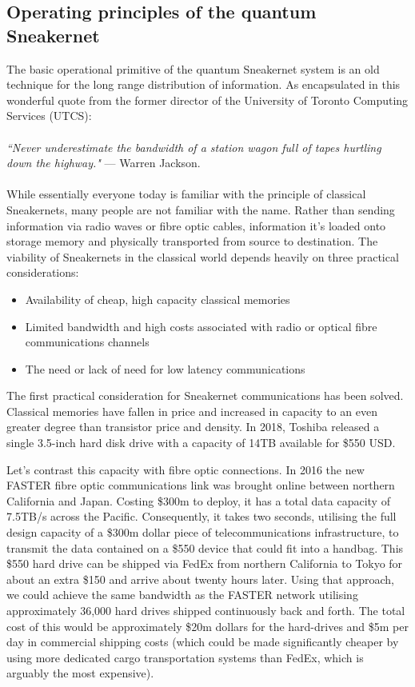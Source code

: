 \documentclass[twocolumn, aps, rmp, amsmath, amssymb, nofootinbib, superscriptaddress, longbibliography, floatfix, table-of-contents, eqsecnum]{revtex4-2}
\newcommand{\famousquote}[2]{\noindent\textit{``#1"} --- #2.\index{Quotes}\index{#2}}
\begin{document}
\subsection{Operating principles of the quantum Sneakernet}

The basic operational primitive of the quantum Sneakernet system is an old technique for the long range distribution of information. As encapsulated in this wonderful quote from the former director of the University of Toronto Computing Services (UTCS):
\\
\\
\famousquote{Never underestimate the bandwidth of a station wagon full of tapes hurtling down the highway.}{Warren Jackson}
\\
\\
While essentially everyone today is familiar with the principle of classical Sneakernets, many people are not familiar with the name. Rather than sending information via radio waves or fibre optic cables, information it's loaded onto storage memory and physically transported from source to destination. The viability of Sneakernets in the classical world depends heavily on three practical considerations:
\begin{itemize}
\item Availability of cheap, high capacity classical memories
\item Limited bandwidth and high costs associated with radio or optical fibre communications channels
\item The need or lack of need for low latency communications 
\end{itemize}

The first practical consideration for Sneakernet communications has been solved. Classical memories have fallen in price and increased in capacity to an even greater degree than transistor price and density. In 2018, Toshiba released a single 3.5-inch hard disk drive with a capacity of 14TB available for \$550 USD. 

Let's contrast this capacity with fibre optic connections. In 2016 the new FASTER fibre optic communications link was brought online between northern California and Japan. Costing \$300m to deploy, it has a total data capacity of 7.5TB/s across the Pacific. Consequently, it takes two seconds, utilising the full design capacity of a \$300m dollar piece of telecommunications infrastructure, to transmit the data contained on a \$550 device that could fit into a handbag. This \$550 hard drive can be shipped via FedEx from northern California to Tokyo for about an extra \$150 and arrive about twenty hours later. Using that approach, we could achieve the same bandwidth as the FASTER network utilising approximately 36,000 hard drives shipped continuously back and forth. The total cost of this would be approximately \$20m dollars for the hard-drives and \$5m per day in commercial shipping costs (which could be made significantly cheaper by using more dedicated cargo transportation systems than FedEx, which is arguably the most expensive).
\end{document}
